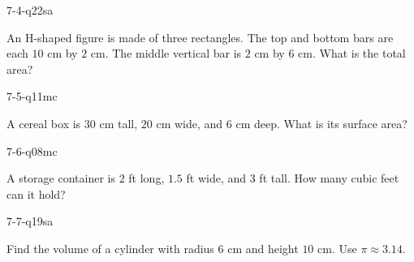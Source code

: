 \begin{practiceQuestion}{7-4-q22}{sa}
\begin{questionText}
An H-shaped figure is made of three rectangles. The top and bottom bars are each $10$ cm by $2$ cm. The middle vertical bar is $2$ cm by $6$ cm. What is the total area?
\end{questionText}
\end{practiceQuestion}

\begin{practiceQuestion}{7-5-q11}{mc}
\begin{questionText}
A cereal box is $30$ cm tall, $20$ cm wide, and $6$ cm deep. What is its surface area?
\end{questionText}
\end{practiceQuestion}

\begin{practiceQuestion}{7-6-q08}{mc}
\begin{questionText}
A storage container is $2$ ft long, $1.5$ ft wide, and $3$ ft tall. How many cubic feet can it hold?
\end{questionText}
\end{practiceQuestion}

\begin{practiceQuestion}{7-7-q19}{sa}
\begin{questionText}
Find the volume of a cylinder with radius $6$ cm and height $10$ cm. Use $\pi \approx 3.14$.
\end{questionText}
\end{practiceQuestion}

